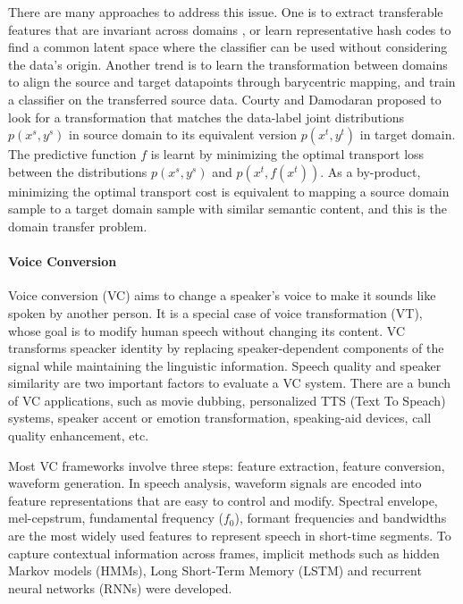 \documentclass{article}
\begin{document}
There are many approaches to address this issue. One is to extract transferable features that are invariant across domains \cite{Ganin:2016:DTN:2946645.2946704, Long:2015:LTF:3045118.3045130}, or learn representative hash codes \cite{Venkateswara_2017_CVPR} to find a common latent space where the classifier can be used without considering the data's origin. Another trend is to learn the transformation between domains \cite{7586038} to align the source and target datapoints through barycentric mapping, and train a classifier on the transferred source data. Courty \cite{NIPS2017_6963} and Damodaran \cite{10.1007/978-3-030-01225-0_28} proposed to look for a transformation that matches the data-label joint distributions $p(x^s, y^s)$ in source domain to its equivalent version $p(x^t, y^t)$ in target domain. The predictive function $f$ is learnt by minimizing the optimal transport loss between the distributions $p(x^s, y^s)$ and $p(x^t, f(x^t))$. As a by-product, minimizing the optimal transport cost is equivalent to mapping a source domain sample to a target domain sample with similar semantic content, and this is the domain transfer problem.


\paragraph{Voice Conversion}
Voice conversion (VC) aims to change a speaker's voice to make it sounds like spoken by another person. It is a special case of voice transformation (VT), whose goal is to modify human speech without changing its content. VC transforms speacker identity by replacing speaker-dependent components of the signal while maintaining the linguistic information. Speech quality and speaker similarity are two important factors to evaluate a VC system. There are a bunch of VC applications, such as movie dubbing, personalized TTS (Text To Speach) systems, speaker accent or emotion transformation, speaking-aid devices, call quality enhancement, etc.

Most VC frameworks involve three steps: feature extraction, feature conversion, waveform generation. In speech analysis, waveform signals are encoded into feature representations that are easy to control and modify. Spectral envelope, mel-cepstrum, fundamental frequency ($f_0$), formant frequencies and bandwidths are the most widely used features to represent speech in short-time segments. To capture contextual information across frames, implicit methods such as hidden Markov models (HMMs), Long Short-Term Memory (LSTM) and recurrent neural networks (RNNs) \cite{7552917} were developed.
\end{document}
